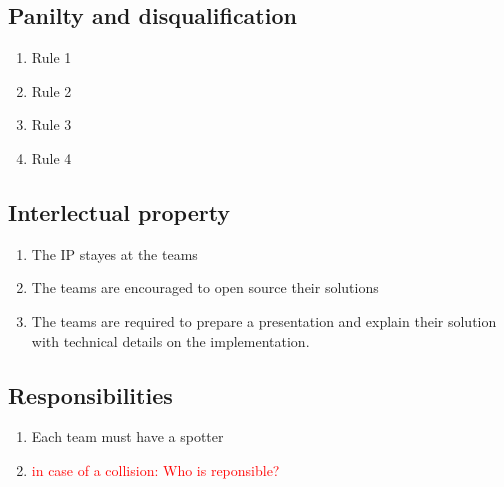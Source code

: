 \subsection{Panilty and disqualification}
\begin{enumerate}
	\item{Rule 1}
	\item{Rule 2}
	\item{Rule 3}
	\item{Rule 4}
\end{enumerate}

\subsection{Interlectual property}
\begin{enumerate}
	\item{The IP stayes at the teams}
	\item{The teams are encouraged to open source their solutions}
	\item{The teams are required to prepare a presentation and explain their solution with technical details on the implementation.}
\end{enumerate}

\subsection{Responsibilities}
\begin{enumerate}
	\item{Each team must have a spotter}
	\item{\textcolor{red}{in case of a collision: Who is reponsible? }}

\end{enumerate}
